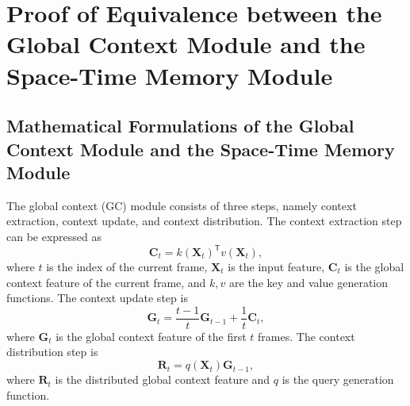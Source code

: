 \documentclass[runningheads]{llncs}
\begin{document}



\clearpage
\appendix

\section{Proof of Equivalence between the Global Context Module and the Space-Time Memory Module}
\label{sec:method}

\subsection{Mathematical Formulations of the Global Context Module and the Space-Time Memory Module}

The global context (GC) module consists of three steps, namely context extraction, context update, and context distribution. The context extraction step can be expressed as
\begin{equation}
\label{eq:feat-prod}
    \bm{C}_t = k(\bm{X}_t)^\mathsf{T}v(\bm{X}_t),
\end{equation}
where $t$ is the index of the current frame, $\bm{X}_t$ is the input feature, $\bm{C}_t$ is the global context feature of the current frame, and $k, v$ are the key and value generation functions. The context update step is
\begin{equation}
\label{eq:feat-update}
    \bm{G}_t = \frac{t - 1}{t}\bm{G}_{t - 1} + \frac{1}{t}\bm{C}_t,
\end{equation}
where $\bm{G}_t$ is the global context feature of the first $t$ frames. The context distribution step is
\begin{equation}
\label{eq:feat-retriev}
    \bm{R}_t = q(\bm{X}_t)\bm{G}_{t - 1},
\end{equation}
where $\bm{R}_t$ is the distributed global context feature and $q$ is the query generation function.
\end{document}
